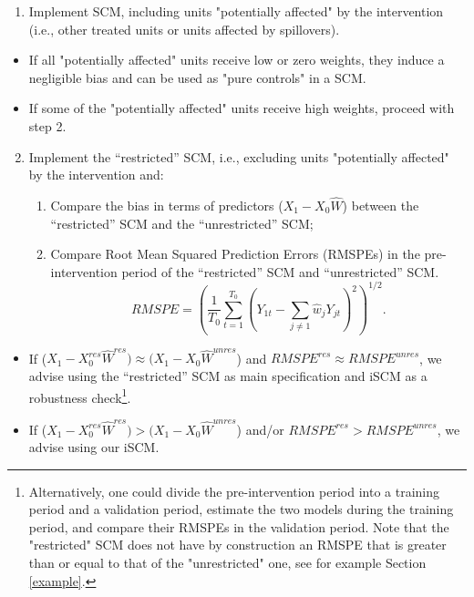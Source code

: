 \begin{enumerate}
    \item Implement SCM, including units "potentially affected" by the intervention (i.e., other treated units or units affected by spillovers).
\end{enumerate}
\begin{itemize}
\item If all "potentially affected" units receive low or zero weights, they induce a negligible bias and can be used as "pure controls" in a SCM.
\item If some of the "potentially affected" units receive high weights, proceed with step 2.
\end{itemize}
\begin{enumerate}\setcounter{enumi}{1}
    \item Implement the ``restricted'' SCM, i.e., excluding units "potentially affected" by the intervention and:
\begin{enumerate}
\item Compare the bias in terms of predictors ($X_1-X_0\widehat{W}$) between the ``restricted'' SCM and the ``unrestricted'' SCM;
\item Compare Root Mean Squared Prediction Errors (RMSPEs) in the pre-intervention period of the ``restricted'' SCM and ``unrestricted''  SCM.
\begin{equation*}
RMSPE=\left( \frac{1}{T_{0}}\sum_{t=1}^{T_{0}} \left(Y_{1t} - \sum_{j\neq1}\widehat{w}_jY_{jt}\right)^2\right)^{1/2}.
\end{equation*}
\end{enumerate}
\end{enumerate}
\begin{itemize}
\item If ($X_1-X_0^{res}\widehat{W}^{res})\approx (X_1-X_0\widehat{W}^{unres}$) and $RMSPE^{res}\approx RMSPE^{unres}$, we advise using the ``restricted'' SCM as main specification and iSCM as a robustness check\footnote{Alternatively, one could divide the pre-intervention period into a training period and a validation period, estimate the two models during the training period, and compare their RMSPEs in the validation period. Note that the "restricted" SCM does not have by construction an RMSPE that is greater than or equal to that of the "unrestricted" one, see for example Section \ref{example}.}.
\item If ($X_1-X_0^{res}\widehat{W}^{res})>(X_1-X_0\widehat{W}^{unres}$) and/or $RMSPE^{res}>RMSPE^{unres}$, we advise using our iSCM.
\end{itemize}


